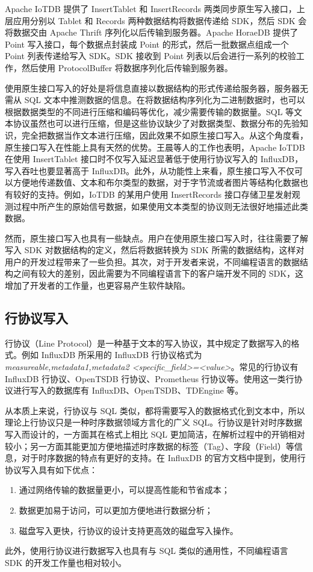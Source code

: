 Apache IoTDB 提供了 InsertTablet 和 InsertRecords 两类同步原生写入接口，上层应用分别以 Tablet 和 Records 两种数据结构将数据传递给 SDK，然后 SDK 会将数据交由 Apache Thrift\cite{apache2024thrift} 序列化以后传输到服务器。Apache HoraeDB 提供了 Point 写入接口，每个数据点封装成 Point 的形式，然后一批数据点组成一个 Point 列表传递给写入 SDK。SDK 接收到 Point 列表以后会进行一系列的校验工作，然后使用 ProtocolBuffer\cite{currier2022protocol} 将数据序列化后传输到服务器。

使用原生接口写入的好处是将信息直接以数据结构的形式传递给服务器，服务器无需从 SQL 文本中推测数据的信息。在将数据结构序列化为二进制数据时，也可以根据数据类型的不同进行压缩和编码等优化，减少需要传输的数据量。SQL 等文本协议虽然也可以进行压缩，但是这些协议缺少了对数据类型、数据分布的先验知识，完全把数据当作文本进行压缩，因此效果不如原生接口写入。从这个角度看，原生接口写入在性能上具有天然的优势。王晨等人的工作也表明，Apache IoTDB 在使用 InsertTablet 接口时不仅写入延迟显著低于使用行协议写入的 InfluxDB，写入吞吐也要显著高于 InfluxDB\cite{wang2023apache}。此外，从功能性上来看，原生接口写入不仅可以方便地传递数值、文本和布尔类型的数据，对于字节流或者图片等结构化数据也有较好的支持。例如，IoTDB 的某用户使用 InsertRecords 接口存储卫星发射观测过程中所产生的原始信号数据，如果使用文本类型的协议则无法很好地描述此类数据。

然而，原生接口写入也具有一些缺点。用户在使用原生接口写入时，往往需要了解写入 SDK 对数据结构的定义，然后将数据转换为 SDK 所需的数据结构，这样对用户的开发过程带来了一些负担。其次，对于开发者来说，不同编程语言的数据结构之间有较大的差别，因此需要为不同编程语言下的客户端开发不同的 SDK，这增加了开发者的工作量，也更容易产生软件缺陷。

\subsection{行协议写入}
行协议（Line Protocol）\cite{influx2024lineprotocol}是一种基于文本的写入协议，其中规定了数据写入的格式。例如 InfluxDB 所采用的 InfluxDB 行协议格式为\emph{measureable,metadata1,metadata2 <specific\_field>=<value>}。常见的行协议有 InfluxDB 行协议、OpenTSDB 行协议、Prometheus 行协议等。使用这一类行协议进行写入的数据库有 InfluxDB、OpenTSDB、TDEngine 等。

从本质上来说，行协议与 SQL 类似，都将需要写入的数据格式化到文本中，所以理论上行协议只是一种时序数据领域方言化的广义 SQL。行协议是针对时序数据写入而设计的，一方面其在格式上相比 SQL 更加简洁，在解析过程中的开销相对较小；另一方面其能更加方便地描述时序数据的标签（Tag）、字段（Field）等信息，对于时序数据的特点有更好的支持。在 InfluxDB 的官方文档中提到，使用行协议写入具有如下优点：
\begin{enumerate}
  \item 通过网络传输的数据量更小，可以提高性能和节省成本；
  \item 数据更加易于访问，可以更加方便地进行数据分析；
  \item 磁盘写入更快，行协议的设计支持更高效的磁盘写入操作。
\end{enumerate}
此外，使用行协议进行数据写入也具有与 SQL 类似的通用性，不同编程语言 SDK 的开发工作量也相对较小。

